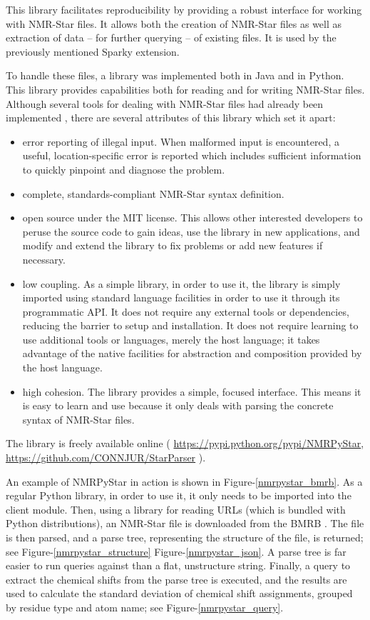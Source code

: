 This library facilitates reproducibility by providing a robust interface
for working with NMR-Star files.  It allows both the creation of NMR-Star 
files as well as extraction of data -- for further querying -- of existing
files.  It is used by the previously mentioned Sparky extension.

To handle these files, a library was implemented both in Java 
\cite{fenwick2013} and in Python.  This library provides capabilities both
for reading and for writing NMR-Star files.  Although several tools for
dealing with NMR-Star files had already been implemented \cite{ccpn, bmrb},
there are several attributes of this library which set it apart:
\begin{itemize}
  \item error reporting of illegal input.  When malformed input is encountered,
    a useful, location-specific error is reported which includes sufficient
    information to quickly pinpoint and diagnose the problem.
  \item complete, standards-compliant NMR-Star syntax definition.
  \item open source under the MIT license.  This allows other interested 
    developers to peruse the source code to gain ideas, use the library in
    new applications, and modify and extend the library to fix problems or
    add new features if necessary.
  \item low coupling.  As a simple library, in order to use it, the library
    is simply imported using standard language facilities in order to use
    it through its programmatic API.  It does not require any external tools
    or dependencies, reducing the barrier to setup and installation.  It does
    not require learning to use additional tools or languages, merely the 
    host language; it takes advantage of the native facilities for abstraction
    and composition provided by the host language.
  \item high cohesion.  The library provides a simple, focused interface.
    This means it is easy to learn and use because it only deals with parsing
    the concrete syntax of NMR-Star files.
\end{itemize}
The library is freely available online (
\url{https://pypi.python.org/pypi/NMRPyStar}, 
\url{https://github.com/CONNJUR/StarParser}
).

An example of NMRPyStar in action is shown in Figure-\ref{nmrpystar_bmrb}.
As a regular Python library, in order to use it, it only needs to be 
imported into the client module.  Then, using a library for reading URLs
(which is bundled with Python distributions), an NMR-Star file is downloaded
from the BMRB \cite{bmrb}.  The file is then parsed, and a parse tree, 
representing the structure of the file, is returned; see 
Figure-\ref{nmrpystar_structure} Figure-\ref{nmrpystar_json}.  
A parse tree is far easier to run queries against than a flat,
unstructure string.  Finally, a query to extract the chemical shifts
from the parse tree is executed, and the results are used to calculate the
standard deviation of chemical shift assignments, grouped by residue type
and atom name; see Figure-\ref{nmrpystar_query}.

